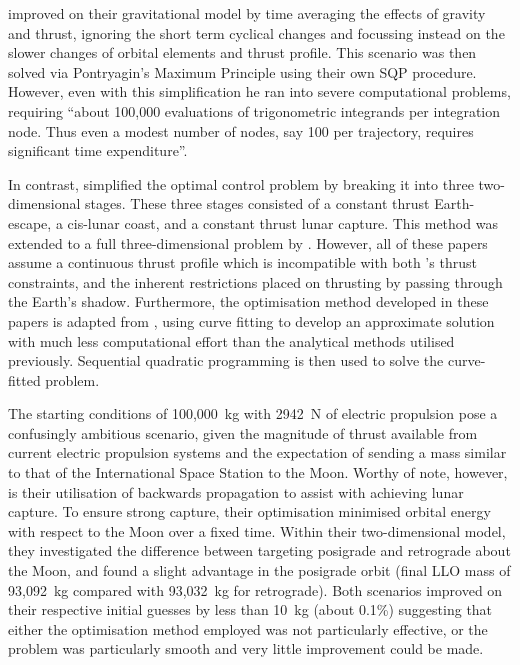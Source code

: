 \textcite{Guelman2000} improved on their gravitational model by time averaging the effects of gravity and thrust, ignoring the short term cyclical changes and focussing instead on the slower changes of orbital elements and thrust profile. This scenario was then solved via Pontryagin's Maximum Principle using their own SQP procedure. However, even with this simplification he ran into severe computational problems, requiring \enquote{about 100,000 evaluations of trigonometric integrands per integration node. Thus even a modest number of nodes, say 100 per trajectory, requires significant time expenditure}. 

In contrast, \textcite{Pierson1994} simplified the optimal control problem by breaking it into three two-dimensional stages. These three stages consisted of a constant thrust Earth-escape, a cis-lunar coast, and a constant thrust lunar capture. This method was extended to a full three-dimensional problem by \textcite{Kluever1995,Kluever1996,Kluever1997}. However, all of these papers assume a continuous thrust profile which is incompatible with both \BW's thrust constraints, and the inherent restrictions placed on thrusting by passing through the Earth's shadow. Furthermore, the optimisation method developed in these papers is adapted from \textcite{Edelbaum1964}, using curve fitting to develop an approximate solution with much less computational effort than the analytical methods utilised previously. Sequential quadratic programming is then used to solve the curve-fitted problem.

The starting conditions of 100,000~kg with 2942~N of electric propulsion pose a confusingly ambitious scenario, given the magnitude of thrust available from current electric propulsion systems and the expectation of sending a mass similar to that of the International Space Station to the Moon. Worthy of note, however, is their utilisation of backwards propagation to assist with achieving lunar capture. To ensure strong capture, their optimisation minimised orbital energy with respect to the Moon over a fixed time. Within their two-dimensional model, they investigated the difference between targeting posigrade and retrograde about the Moon, and found a slight advantage in the posigrade orbit (final LLO mass of 93,092~kg compared with 93,032~kg for retrograde). Both scenarios improved on their respective initial guesses by less than 10~kg (about 0.1\%) suggesting that either the optimisation method employed was not particularly effective, or the problem was particularly smooth and very little improvement could be made. 

